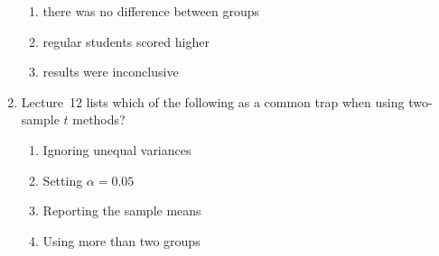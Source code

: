 \documentclass{article}
\begin{document}
\begin{enumerate}
\begin{enumerate}[label=(\Alph*)]
  \item there was no difference between groups
  \item regular students scored higher
  \item results were inconclusive
  \end{enumerate}
\item Lecture~12 lists which of the following as a common trap when using two-sample $t$ methods?
  \begin{enumerate}[label=(\Alph*)]
  \item Ignoring unequal variances
  \item Setting $\alpha=0.05$
  \item Reporting the sample means
  \item Using more than two groups
  \end{enumerate}
\end{enumerate}
\end{document}
